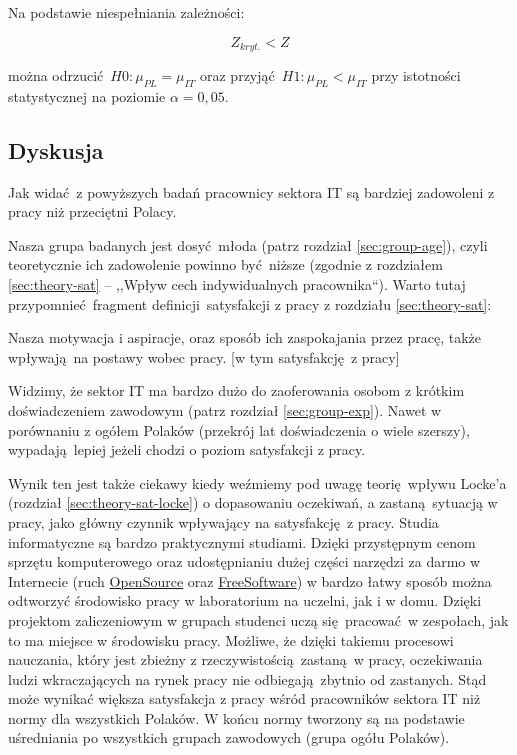 Na podstawie niespełniania zależności:

\begin{equation}
  Z_{kryt.} < Z
\end{equation}

można odrzucić $H0: \mu_{PL} = \mu_{IT}$ oraz przyjąć $H1: \mu_{PL} < \mu_{IT}$ przy istotności statystycznej na poziomie $\alpha = 0,05$.

\subsection{Dyskusja}
Jak widać z powyższych badań pracownicy sektora IT są bardziej zadowoleni z pracy niż przeciętni Polacy. 

Nasza grupa badanych jest dosyć młoda (patrz rozdział \ref{sec:group-age}), czyli teoretycznie ich zadowolenie powinno być niższe (zgodnie z rozdziałem \ref{sec:theory-sat} -- ,,Wpływ cech indywidualnych pracownika``). Warto tutaj przypomnieć fragment definicji satysfakcji z pracy z rozdziału \ref{sec:theory-sat}:
\begin{iquote}
  Nasza motywacja i aspiracje, oraz sposób ich zaspokajania przez pracę, także wpływają na postawy wobec pracy. [w tym satysfakcję z pracy] \cite[str. 296]{SchultzSat}
\end{iquote}
Widzimy, że sektor IT ma bardzo dużo do zaoferowania osobom z krótkim doświadczeniem zawodowym (patrz rozdział \ref{sec:group-exp}). Nawet w porównaniu z ogółem Polaków (przekrój lat doświadczenia o wiele szerszy), wypadają lepiej jeżeli chodzi o poziom satysfakcji z pracy.

Wynik ten jest także ciekawy kiedy weźmiemy pod uwagę teorię wpływu Locke'a (rozdział \ref{sec:theory-sat-locke}) o dopasowaniu oczekiwań, a zastaną sytuacją w pracy, jako główny czynnik wpływający na satysfakcję z pracy. Studia informatyczne są bardzo praktycznymi studiami. Dzięki przystępnym cenom sprzętu komputerowego oraz udostępnianiu dużej części narzędzi za darmo w Internecie (ruch
\href{http://en.wikipedia.org/wiki/Open-source_software}{OpenSource} oraz \href{http://en.wikipedia.org/wiki/Free_software}{FreeSoftware}) w bardzo łatwy sposób można odtworzyć środowisko pracy w laboratorium na uczelni, jak i w domu. Dzięki projektom zaliczeniowym w grupach studenci uczą się pracować w zespołach, jak to ma miejsce w środowisku pracy. Możliwe, że dzięki takiemu procesowi nauczania, który jest zbieżny z rzeczywistością zastaną w pracy, oczekiwania ludzi
wkraczających na rynek pracy nie odbiegają zbytnio od zastanych. Stąd może wynikać większa satysfakcja z pracy wśród pracowników sektora IT niż normy dla wszystkich Polaków. W końcu normy tworzony są na podstawie uśredniania po wszystkich grupach zawodowych (grupa ogółu Polaków).

